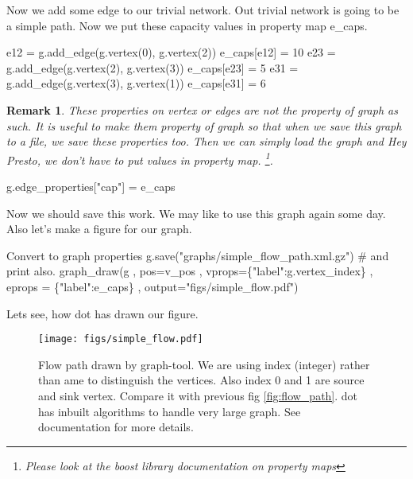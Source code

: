 \documentclass[10pt,a4paper]{article}%
\newtheorem{remark}{Remark}
\begin{document}
\nwendcode{}  Now we add some edge to our trivial network. Out trivial network is going
    to be a simple path. Now we put these capacity values in property map
    {\Tt{}e{\_}caps\nwendquote}.

\nwenddocs{}\plusendmoddef\nwstartdeflinemarkup\nwenddeflinemarkup
e12 = g.add_edge(g.vertex(0), g.vertex(2))
e_caps[e12] = 10
e23 = g.add_edge(g.vertex(2), g.vertex(3))
e_caps[e23] = 5
e31 = g.add_edge(g.vertex(3), g.vertex(1))
e_caps[e31] = 6

\nwendcode{}\begin{remark} 
    
    These properties on vertex or edges are not the property of
    graph as such. It is useful to make them property of graph so that when we
    save this graph to a file, we save these properties too. Then we can simply
    load the graph and Hey Presto, we don't have to put values in property map.
    \footnote{Please look at the boost library documentation on property maps}.
    
\end{remark}

\nwenddocs{}\endmoddef\nwstartdeflinemarkup\nwenddeflinemarkup
g.edge_properties["cap"] = e_caps 

\nwendcode{}Now we should save this work. We may like to use this graph again some day.
Also let's make a figure for our graph.

\nwenddocs{}\endmoddef\nwstartdeflinemarkup\nwenddeflinemarkup
\LA{}Convert to graph properties\RA{}
g.save("graphs/simple_flow_path.xml.gz")
# and print also.
graph_draw(g , pos=v_pos
    , vprops=\{"label":g.vertex_index\}
    , eprops = \{"label":e_caps\}
    , output="figs/simple_flow.pdf")

\nwendcode{}Lets see, how {\Tt{}dot\nwendquote} has drawn our figure.
\begin{figure}[h]
\centering
\texttt{[image: figs/simple\_flow.pdf]}
\caption{Flow path drawn by graph-tool. We are using index (integer) rather than
ame to distinguish the vertices. Also index 0 and 1 are source and sink vertex.
Compare it with previous fig \ref{fig:flow_path}. {\Tt{}dot\nwendquote} has inbuilt algorithms
to handle very large graph. See documentation for more details.}
\end{figure}
\end{document}
